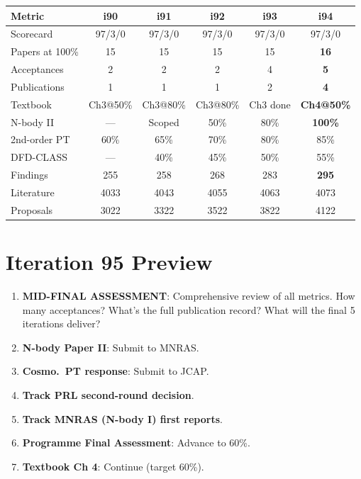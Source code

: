 \documentclass[11pt,a4paper]{article}
\begin{document}
\begin{center}
\begin{tabular}{lccccc}
\toprule
\textbf{Metric} & \textbf{i90} & \textbf{i91} & \textbf{i92} & \textbf{i93} & \textbf{i94} \\
\midrule
Scorecard & 97/3/0 & 97/3/0 & 97/3/0 & 97/3/0 & 97/3/0 \\
Papers at 100\% & 15 & 15 & 15 & 15 & \textbf{16} \\
Acceptances & 2 & 2 & 2 & 4 & \textbf{5} \\
Publications & 1 & 1 & 1 & 2 & \textbf{4} \\
Textbook & Ch3@50\% & Ch3@80\% & Ch3@80\% & Ch3 done & \textbf{Ch4@50\%} \\
N-body II & --- & Scoped & 50\% & 80\% & \textbf{100\%} \\
2nd-order PT & 60\% & 65\% & 70\% & 80\% & 85\% \\
DFD-CLASS & --- & 40\% & 45\% & 50\% & 55\% \\
Findings & 255 & 258 & 268 & 283 & \textbf{295} \\
Literature & 4033 & 4043 & 4055 & 4063 & 4073 \\
Proposals & 3022 & 3322 & 3522 & 3822 & 4122 \\
\bottomrule
\end{tabular}
\end{center}

\section{Iteration 95 Preview}

\begin{tcolorbox}[colback=blue!5!white, colframe=dfdblue, title=\textbf{i95 Targets: MID-FINAL ASSESSMENT}]
\begin{enumerate}[nosep]
\item \textbf{MID-FINAL ASSESSMENT}: Comprehensive review of all metrics. How many acceptances? What's the full publication record? What will the final 5 iterations deliver?
\item \textbf{N-body Paper II}: Submit to MNRAS.
\item \textbf{Cosmo.\ PT response}: Submit to JCAP.
\item \textbf{Track PRL second-round decision}.
\item \textbf{Track MNRAS (N-body I) first reports}.
\item \textbf{Programme Final Assessment}: Advance to 60\%.
\item \textbf{Textbook Ch 4}: Continue (target 60\%).
\end{enumerate}
\end{tcolorbox}
\end{document}
